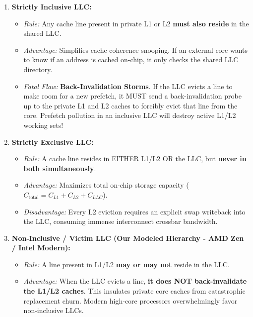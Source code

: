 \documentclass[11pt, a4paper]{article}
\begin{document}
\begin{defensebox}[title=\textbf{Inclusion Paradigms Explained}]
\begin{enumerate}[leftmargin=1.2em]
  \item \textbf{Strictly Inclusive LLC:}
  \begin{itemize}
    \item \textit{Rule:} Any cache line present in private L1 or L2 \textbf{must also reside} in the shared LLC.
    \item \textit{Advantage:} Simplifies cache coherence snooping. If an external core wants to know if an address is cached on-chip, it only checks the shared LLC directory.
    \item \textit{Fatal Flaw:} \textbf{Back-Invalidation Storms}. If the LLC evicts a line to make room for a new prefetch, it MUST send a back-invalidation probe up to the private L1 and L2 caches to forcibly evict that line from the core. Prefetch pollution in an inclusive LLC will destroy active L1/L2 working sets!
  \end{itemize}

  \item \textbf{Strictly Exclusive LLC:}
  \begin{itemize}
    \item \textit{Rule:} A cache line resides in EITHER L1/L2 OR the LLC, but \textbf{never in both simultaneously}.
    \item \textit{Advantage:} Maximizes total on-chip storage capacity ($C_{\text{total}} = C_{L1} + C_{L2} + C_{LLC}$).
    \item \textit{Disadvantage:} Every L2 eviction requires an explicit swap writeback into the LLC, consuming immense interconnect crossbar bandwidth.
  \end{itemize}

  \item \textbf{Non-Inclusive / Victim LLC (Our Modeled Hierarchy - AMD Zen / Intel Modern):}
  \begin{itemize}
    \item \textit{Rule:} A line present in L1/L2 \textbf{may or may not} reside in the LLC.
    \item \textit{Advantage:} When the LLC evicts a line, \textbf{it does NOT back-invalidate the L1/L2 caches}. This insulates private core caches from catastrophic replacement churn. Modern high-core processors overwhelmingly favor non-inclusive LLCs.
  \end{itemize}
\end{enumerate}
\end{defensebox}
\end{document}
